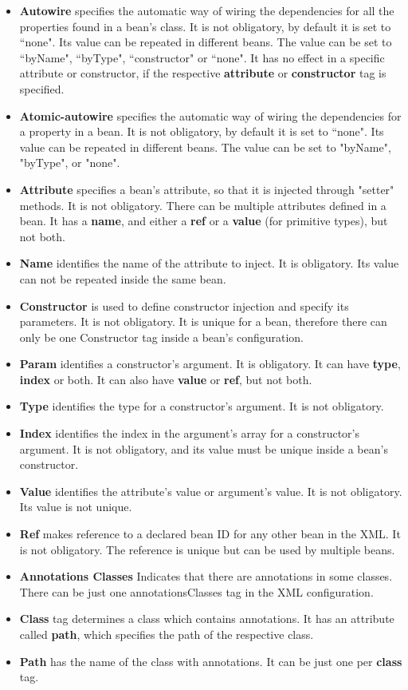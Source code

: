 \documentclass[a4paper, 12pt, notitlepage]{report}
\begin{document}
\begin{itemize}
    \item \textbf{Autowire} specifies the automatic way of wiring the dependencies for all the properties found in a bean's class. It is not obligatory, by default it is set to ``none". Its value can be repeated in different beans. The value can be set to ``byName", ``byType", ``constructor" or ``none". It has no effect in a specific attribute or constructor, if the respective \textbf{attribute} or \textbf{constructor} tag is specified.
    \item \textbf{Atomic-autowire} specifies the automatic way of wiring the dependencies for a property in a bean. It is not obligatory, by default it is set to ``none". Its value can be repeated in different beans. The value can be set to "byName", "byType", or "none".
    \item \textbf{Attribute} specifies a bean's attribute, so that it is injected through "setter" methods. It is not obligatory. There can be multiple attributes defined in a bean. It has a \textbf{name}, and either a \textbf{ref} or a \textbf{value} (for primitive types), but not both.
    \item \textbf{Name} identifies the name of the attribute to inject. It is obligatory. Its value can not be repeated inside the same bean.
    \item \textbf{Constructor} is used to define constructor injection and specify its parameters. It is not obligatory. It is unique for a bean, therefore there can only be one Constructor tag inside a bean's configuration.
    \item \textbf{Param} identifies a constructor's argument. It is obligatory. It can have \textbf{type}, \textbf{index} or both. It can also have \textbf{value} or \textbf{ref}, but not both.
    \item \textbf{Type} identifies the type for a  constructor's argument. It is not obligatory.
    \item \textbf{Index} identifies the index in the argument's array for a constructor's argument. It is not obligatory, and its value must be unique inside a bean's constructor.
    \item \textbf{Value} identifies the attribute's value or argument's value. It is not obligatory. Its value is not unique.
    \item \textbf{Ref} makes reference to a declared bean ID for any other bean in the XML. It is not obligatory. The reference is unique but can be used by multiple beans.
    \item \textbf{Annotations Classes} Indicates that there are annotations in some classes. There can be just one annotationsClasses tag in the XML configuration.
    \item \textbf{Class} tag determines a class which contains annotations. It has an attribute called \textbf{path}, which specifies the path of the respective class.
    \item \textbf{Path} has the name of the class with annotations. It can be just one per \textbf{class} tag.
\end{itemize}
\end{document}
